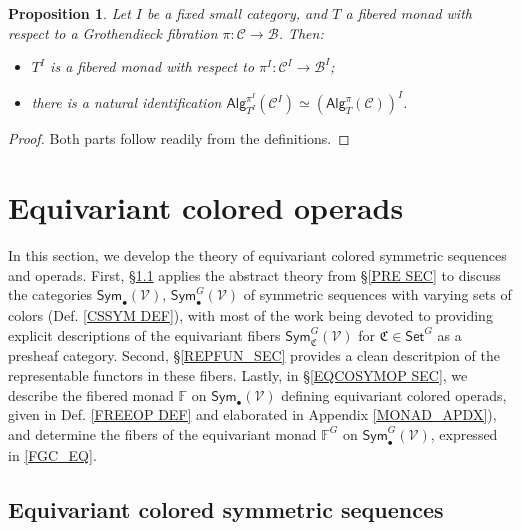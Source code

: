 \documentclass[a4paper,10pt
,draft
]{article}%
\numberwithin{equation}{section}
\numberwithin{figure}{section}
\newtheorem{proposition}[equation]{Proposition}%
\theoremstyle{definition} %
\newcommand{\Sym}{\ensuremath{\mathsf{Sym}}}%
\newcommand{\V}{\ensuremath{\mathcal V}}
\newcommand{\1}{\ensuremath{\mathbbm 1}}%
\begin{document}
\begin{proposition}\label{DIAGRAMFM_PROP}
	Let $I$ be a fixed small category, and $T$ a fibered monad with respect to a Grothendieck fibration 
	$\pi \colon \mathcal{C} \to \mathcal{B}$. Then:
	\begin{itemize}
		\item[(i)] $T^I$ is a fibered monad with respect to $\pi^I\colon \mathcal{C}^I \to \mathcal{B}^I$;
		\item[(ii)] there is a natural identification 
		$\mathsf{Alg}_{T^I}^{\pi^I}(\mathcal{C}^I)
		\simeq
		\left(\mathsf{Alg}_T^{\pi}(\mathcal{C})\right)^I$.
	\end{itemize}
\end{proposition}

\begin{proof}
	Both parts follow readily from the definitions.
\end{proof}





\section{Equivariant colored operads}
\label{ECO_SEC}

In this section, we develop the theory of equivariant colored symmetric sequences and operads.
First, \S \ref{EQCOSYMSEQ SEC} applies the abstract theory from \S \ref{PRE SEC}
to discuss the categories
$\mathsf{Sym}_{\bullet}(\V)$,
$\mathsf{Sym}^G_{\bullet}(\V)$
of symmetric sequences with varying sets of colors (Def. \ref{CSSYM DEF}), 
with most of the work being devoted to providing 
explicit descriptions of the equivariant fibers
$\mathsf{Sym}^G_{\mathfrak{C}}(\V)$
for $\mathfrak{C} \in \mathsf{Set}^G$
as a presheaf category.
Second, \S \ref{REPFUN_SEC} provides a clean descritpion of the representable functors in these fibers.
%
Lastly, in \S \ref{EQCOSYMOP SEC}, 
we describe the fibered monad $\mathbb F$ on $\Sym_\bullet(\V)$ defining equivariant colored operads,
given in Def. \ref{FREEOP DEF} and elaborated in Appendix \ref{MONAD_APDX}),
and determine the fibers of the equivariant monad $\mathbb F^G$ on $\Sym_\bullet^G(\V)$, expressed in \eqref{FGC_EQ}.



\subsection{Equivariant colored symmetric sequences}
\label{EQCOSYMSEQ SEC}
\end{document}
